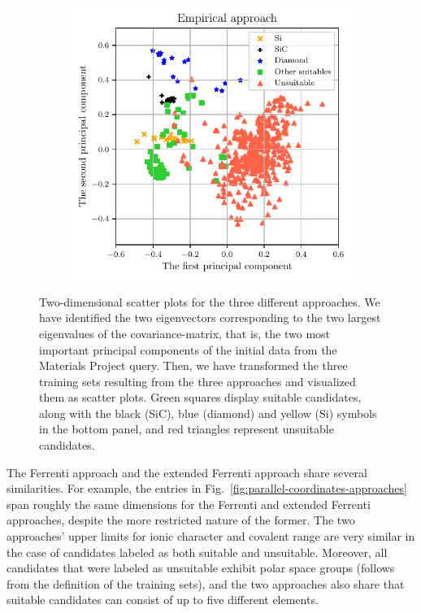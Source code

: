 \documentclass[superscriptaddress,unsortedaddress,
 amsmath,amssymb,
 aps,
]{revtex4-2}
\begin{document}
\begin{figure}
\begin{subfigure}{0.35\textwidth}
    \end{subfigure}
    \begin{subfigure}{0.4\textwidth}
        \centering
        \includegraphics[width=1\textwidth]{figures/pca-2d-plots/03-insightful-approach.pdf}
    \end{subfigure}
    \caption{Two-dimensional scatter plots for the three different approaches. We have identified the two eigenvectors corresponding to the two largest eigenvalues of the covariance-matrix, that is, the two most important principal components of the initial data from the Materials Project query. Then, we have transformed the three training sets resulting from the three approaches and visualized them as scatter plots. Green squares display suitable candidates, along with the black (SiC), blue (diamond) and yellow (Si) symbols in the bottom panel, and red triangles represent unsuitable candidates.}
    \label{fig:2dscatterplotpca}
\end{figure}


The Ferrenti approach and the extended Ferrenti approach share several similarities. For example, the entries in  Fig.~\ref{fig:parallel-coordinates-approaches} span roughly the same dimensions for the Ferrenti and extended Ferrenti approaches, despite the more restricted nature of the former.  
The two approaches' upper limits for ionic character and covalent range are very similar in the case of candidates labeled as both suitable and unsuitable.   
Moreover, all candidates that were labeled as unsuitable exhibit polar space groups (follows from the definition of the training sets), and the two approaches also share that suitable candidates can consist of up to five different elements. 
\end{document}
